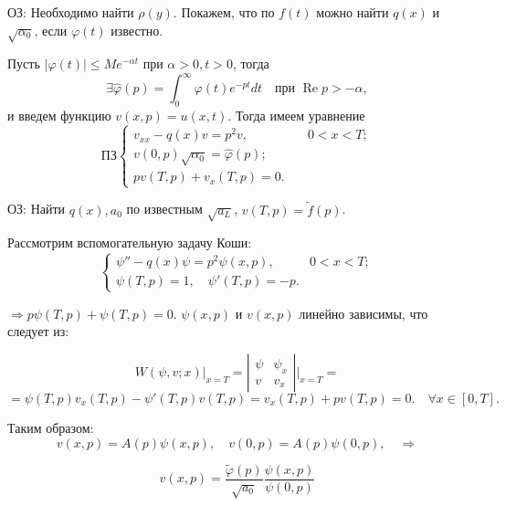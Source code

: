 \documentclass{article}
\begin{document}
ОЗ: Необходимо найти $\rho(y)$. 
Покажем, что по $f(t)$ можно найти $q(x)$ и $\sqrt{\alpha_0}$, если $\varphi(t)$ известно.

Пусть $|\varphi(t)| \leq M e^{-\alpha t}$ при $\alpha > 0, t > 0$, тогда
\begin{equation}
    \exists \hat{\varphi}(p) = \int_0^\infty \varphi(t) e^{-pt} dt \quad \text{при } \operatorname{Re} p > -\alpha,
\end{equation}
и введем функцию $v(x,p) =  u(x,t)$.
Тогда имеем уравнение
\begin{equation*}
\texttt{ПЗ}
\begin{cases}
    v_{xx} - q(x) v = p^2 v, & \quad 0 < x < T;\\
    v(0,p) \sqrt{\alpha_0} = \hat{\varphi}(p);\\
    p v(T,p) + v_x(T,p) = 0.
\end{cases}
\end{equation*}

ОЗ: Найти $q(x), a_0$ по известным $\sqrt{a_L}$, $v(T,p) = \tilde{f}(p)$.

Рассмотрим вспомогательную задачу Коши:
\begin{equation*}
\begin{cases}
    \psi'' - q(x) \psi = p^2 \psi(x,p), & 0 < x < T;\\
    \psi(T,p) = 1, \quad \psi'(T,p) = -p.
\end{cases}
\end{equation*}

$\Rightarrow p \psi(T,p) + \psi(T,p) = 0$. $\psi(x,p)$ и  $v(x,p)$ линейно зависимы, что следует из:

\begin{equation*}
    W(\psi,v;x) \Big|_{x=T} = 
    \left| \begin{array}{cc} \psi & \psi_x \\
    v & v_x \end{array} \right| \Big|_{x=T} =
\end{equation*}
\begin{equation*}
    = \psi(T,p) v_x(T,p) - \psi'(T,p) v(T,p)=
    v_x(T,p) + p v(T,p) = 0. \quad \forall x \in [0,T].
\end{equation*}

Таким образом:
\begin{equation*}
v(x,p) = A(p) \psi(x,p), \quad 
v(0,p) = A(p) \psi(0,p), \quad \Rightarrow
\end{equation*}

\begin{equation*}
v(x,p) = \dfrac{\tilde{\varphi}(p)}{\sqrt{a_0}} \dfrac{\psi(x,p)}{\psi(0,p)}
\end{equation*}
\end{document}
